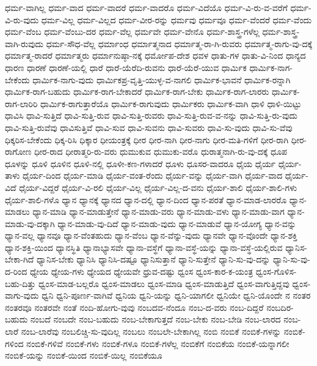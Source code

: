 {ಧರ್ಮ-ವಾಗಿಲ್ಲ
ಧರ್ಮ-ವಾದ
ಧರ್ಮ-ವಾದರೆ
ಧರ್ಮ-ವಾದರೊ
ಧರ್ಮ-ವಿದೆಯೊ
ಧರ್ಮ-ವಿ-ರು-ವ-ವರೆಗೆ
ಧರ್ಮ-ವಿ-ರು-ವುದು
ಧರ್ಮ-ವಿಲ್ಲ
ಧರ್ಮ-ವಿಲ್ಲದ
ಧರ್ಮ-ವೀರ-ರನ್ನು
ಧರ್ಮವು
ಧರ್ಮವೂ
ಧರ್ಮ-ವೆಂದರೆ
ಧರ್ಮ-ವೆಂದು
ಧರ್ಮ-ವೆಂಬ
ಧರ್ಮ-ವೆಂಬು-ದರ
ಧರ್ಮ-ವೆಲ್ಲ
ಧರ್ಮವೇ
ಧರ್ಮ-ವೇನೊ
ಧರ್ಮ-ಶಾಸ್ತ್ರ-ಗಳೆಲ್ಲ
ಧರ್ಮ-ಶಾಸ್ತ್ರ-ವಾಗಿ-ರುವುದು
ಧರ್ಮ-ಸೌಧ-ವೆಲ್ಲ
ಧರ್ಮಾಂಧ
ಧರ್ಮಾತ್ಮನಾದ
ಧರ್ಮಾತ್ಮ-ರಾ-ಗಿ-ರುವರು
ಧರ್ಮಾತ್ಮ-ರಾಗು-ವು-ದಕ್ಕೆ
ಧರ್ಮಾತ್ಮ-ರಾದರೆ
ಧರ್ಮಾತ್ಮರು
ಧರ್ಮಾನುಷ್ಠಾ-ನಕ್ಕೆ
ಧರ್ಮೋಪ-ದೇಶ
ಧವಳ
ಧಾತು-ಗಳ
ಧಾತು-ವಿ-ನಿಂದ
ಧಾನ್ಯದ
ಧಾರಣ
ಧಾರಣೆ
ಧಾರಣೆ-ಯಲ್ಲಿ
ಧಾರೆ
ಧಾರೆ-ಯೆರೆದಿ-ರುವನು
ಧಾರೆ-ಯೆರೆ-ಯುವ
ಧಾರ್ಮಿಕ
ಧಾರ್ಮಿಕ-ನಾಗ-ಬೇಕೆಂದು
ಧಾರ್ಮಿಕ-ನಾಗು-ವುದು
ಧಾರ್ಮಿಕಪ್ರ-ವೃತ್ತಿ-ಯುಳ್ಳ-ವ-ನಾಗಲಿ
ಧಾರ್ಮಿಕ-ಭಾವನೆ
ಧಾರ್ಮಿಕ-ರನ್ನಾಗಿ
ಧಾರ್ಮಿಕ-ರಾಗ-ಬಹುದು
ಧಾರ್ಮಿಕ-ರಾಗ-ಬೇಕಾದರೆ
ಧಾರ್ಮಿಕ-ರಾಗ-ಬೇಕು
ಧಾರ್ಮಿಕ-ರಾಗ-ಲಾರರು
ಧಾರ್ಮಿಕ-ರಾಗ-ಲಾರಿರಿ
ಧಾರ್ಮಿಕ-ರಾಗುತ್ತಾರೆಯೊ
ಧಾರ್ಮಿಕ-ರಾಗುವುದು
ಧಾರ್ಮಿಕರು
ಧಾರ್ಮಿಕ-ವಾಗಿ
ಧಾಳಿ
ಧಾಳಿ-ಯಿಟ್ಟು
ಧಾವಿಸಿ
ಧಾವಿ-ಸುತ್ತಿದೆ
ಧಾವಿ-ಸುತ್ತಿ-ರುವ
ಧಾವಿ-ಸುತ್ತಿ-ರುವರು
ಧಾವಿ-ಸುತ್ತಿ-ರುವ-ವ-ನನ್ನು
ಧಾವಿ-ಸುತ್ತಿ-ರು-ವುದು
ಧಾವಿ-ಸುತ್ತಿ-ರುವೆವು
ಧಾವಿಸುತ್ತಿವೆ
ಧಾವಿ-ಸುವ
ಧಾವಿ-ಸುವನು
ಧಾವಿ-ಸುವರು
ಧಾವಿ-ಸು-ವುದು
ಧಾವಿ-ಸು-ವೆವು
ಧಿಕ್ಕರಿಸ-ಬೇಕೆಂದು
ಧಿಕ್ಕ-ರಿಸಿ
ಧಿಕ್ಕಾರ
ಧೀಯಂತ್ರಕ್ಕೆ
ಧೀರ
ಧೀರ-ನಾಗಿ
ಧೀರ-ನಾಗು
ಧೀರ-ಮತಿ-ಗಳಿಗೆ
ಧೀರ-ರಾಗಿ
ಧೀರ-ರಾಗೋಣ
ಧೀರ-ರಾದ
ಧೀರಾತ್ಮರಿ-ರು-ವರು
ಧುಮುಕುವ
ಧುಮುಕು-ವರೊ
ಧುರಾತ್ಮನಾಗಿ-ರು-ವು-ದಕ್ಕೆ
ಧೂಪ
ಧೂಳನ್ನು
ಧೂಳಿ
ಧೂಳಿನ
ಧೂಳಿ-ನಲ್ಲಿ
ಧೂಳೀ-ಕಣ-ಗಳಾದರೆ
ಧೂಳು
ಧೂಸರ-ವಾದರೂ
ಧೈಯ
ಧೈರ್ಯ
ಧೈರ್ಯ-ತಾಳು
ಧೈರ್ಯ-ದಿಂದ
ಧೈರ್ಯ-ಮಾಡಿ
ಧೈರ್ಯ-ವಂತ-ರೆಂದು
ಧೈರ್ಯ-ವನ್ನು
ಧೈರ್ಯ-ವಾಗಿ
ಧೈರ್ಯ-ವಾದ
ಧೈರ್ಯ-ವಿದೆ
ಧೈರ್ಯ-ವಿದ್ದರೆ
ಧೈರ್ಯ-ವಿ-ರಲಿ
ಧೈರ್ಯ-ವಿಲ್ಲ
ಧೈರ್ಯ-ವಿಲ್ಲ-ದ-ವನು
ಧೈರ್ಯ-ಶಾಲಿ
ಧೈರ್ಯ-ಶಾಲಿ-ಗಳು
ಧೈರ್ಯ-ಶಾಲಿ-ಗಳೊ
ಧ್ಯಾನ
ಧ್ಯಾನಕ್ಕೆ
ಧ್ಯಾನದ
ಧ್ಯಾನ-ದಲ್ಲಿ
ಧ್ಯಾನ-ದಿಂದ
ಧ್ಯಾನ-ಪರತೆ
ಧ್ಯಾನ-ಮಾಡ-ಲಾರರೊ
ಧ್ಯಾನ-ಮಾಡಲು
ಧ್ಯಾನ-ಮಾಡಿ
ಧ್ಯಾನ-ಮಾಡುತ್ತೇನೆ
ಧ್ಯಾನ-ಮಾಡು-ವರು
ಧ್ಯಾನ-ಮಾಡು-ವಳು
ಧ್ಯಾನ-ಮಾಡು-ವಾಗ
ಧ್ಯಾನ-ಮಾಡು-ವು-ದಕ್ಕಾಗಿ
ಧ್ಯಾನ-ಮಾಡು-ವು-ದಿದೆ
ಧ್ಯಾನ-ಮಾಡು-ವುದು
ಧ್ಯಾನ-ಮಾಡುವೆ
ಧ್ಯಾನ-ಯೋಗ್ಯ
ಧ್ಯಾನ-ವನ್ನು
ಧ್ಯಾನ-ವಲ್ಲ
ಧ್ಯಾನವೂ
ಧ್ಯಾನ-ವೆಂತಹುದು
ಧ್ಯಾನ-ವೆಂಬ
ಧ್ಯಾನ-ವೆನ್ನು-ವುದು
ಧ್ಯಾನವೇ
ಧ್ಯಾನ-ವೊಂದೇ
ಧ್ಯಾನ-ಶಕ್ತಿ
ಧ್ಯಾನ-ಶಕ್ತಿ-ಯಿಂದ
ಧ್ಯಾನಸ್ಥಿತಿ
ಧ್ಯಾನಾಭ್ಯಾಸವೇ
ಧ್ಯಾನಾ-ವಸ್ಥೆಗೆ
ಧ್ಯಾನಾ-ವಸ್ಥೆ-ಯನ್ನು
ಧ್ಯಾನಾ-ವಸ್ಥೆ-ಯಲ್ಲಿರುವ
ಧ್ಯಾನಿಸ-ಬೇಕಾ-ಗಿದೆ
ಧ್ಯಾನಿಸ-ಬೇಕು
ಧ್ಯಾನಿಸಿ
ಧ್ಯಾನಿಸಿ-ದಷ್ಟೂ
ಧ್ಯಾನಿಸುತ್ತಾನೆ
ಧ್ಯಾನಿ-ಸುತ್ತೇನೆ
ಧ್ಯಾನಿ-ಸು-ವು-ದನ್ನು
ಧ್ಯಾನಿ-ಸು-ವು-ದ-ರಿಂದ
ಧ್ಯೇಯ
ಧ್ಯೇಯ-ಗಳು
ಧ್ಯೇಯದ
ಧ್ಯೇಯವೇ
ಧ್ರುವ-ದಷ್ಟು
ಧ್ವಂಸ
ಧ್ವಂಸ-ಕಾರ-ಕ-ಯಂತ್ರ
ಧ್ವಂಸ-ಗೊಳಿಸ-ಬಹು-ದಿತ್ತು
ಧ್ವಂಸ-ಮಾಡ-ಬಲ್ಲರೊ
ಧ್ವಂಸ-ಮಾಡಲು
ಧ್ವಂಸ-ಮಾಡಿ
ಧ್ವಂಸ-ಮಾಡುತ್ತಿದೆ
ಧ್ವಂಸ-ವಾಗುತ್ತಿದ್ದವು
ಧ್ವಂಸ-ವಾಗು-ವುದು
ಧ್ವನಿ
ಧ್ವನಿ-ಪೂರ್ಣ-ವಾಗಿವೆ
ಧ್ವನಿಯ
ಧ್ವನಿ-ಯನ್ನು
ಧ್ವನಿ-ಯಾಗಲೀ
ಧ್ವನಿಯೇ
ಧ್ವನಿ-ಯೊಂದೇ
ನ
ನಂತರ
ನಂತರವೂ
ನಂತರವೇ
ನಂತೆ
ನಂದಿ-ಹೋಗು-ವುವು
ನಂಬದವ-ನೆಂದೂ
ನಂಬ-ದ-ವರು
ನಂಬ-ದಿದ್ದರೆ
ನಂಬದಿರ-ಬಹುದು
ನಂಬದೆ
ನಂಬದೇ
ನಂಬ-ಬಹುದು
ನಂಬ-ಬೇಕಾಗುತ್ತದೆ
ನಂಬ-ಬೇಕು
ನಂಬ-ಬೇಡಿ
ನಂಬ-ಲಾರದ
ನಂಬ-ಲಾರೆ
ನಂಬ-ಲಾರೆವು
ನಂಬಲಿಚ್ಚಿ-ಸು-ವುದಿಲ್ಲ
ನಂಬಲು
ನಂಬಲೇ-ಬೇಕಾಗಿಲ್ಲ
ನಂಬಿ
ನಂಬಿಕೆ
ನಂಬಿಕೆ-ಗಳನ್ನು
ನಂಬಿಕೆ-ಗಳಿಂದ
ನಂಬಿಕೆ-ಗಳಿವೆ
ನಂಬಿಕೆ-ಗಳು
ನಂಬಿಕೆ-ಗಳೂ
ನಂಬಿಕೆ-ಗಳೆಲ್ಲ
ನಂಬಿಕೆಗೆ
ನಂಬಿಕೆಯ
ನಂಬಿಕೆ-ಯನ್ನಾಗಲೀ
ನಂಬಿಕೆ-ಯನ್ನು
ನಂಬಿಕೆ-ಯಿಂದ
ನಂಬಿಕೆ-ಯಿಲ್ಲ
ನಂಬಿಕೆಯೂ
}
